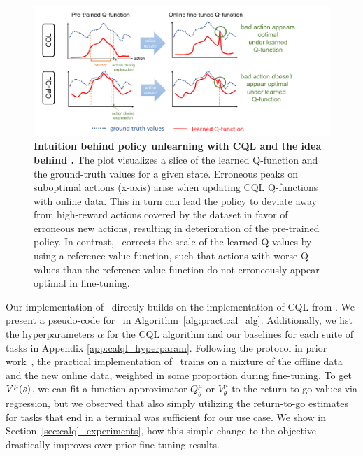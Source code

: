 \begin{figure}
\centering
\vspace{-0.2cm}
\includegraphics[trim={0 0 2.7cm 0},clip,width=0.98\linewidth]{chapters/cal_ql/figs-sample/figure_for_calql_final.pdf}
\vspace{-0.2cm}
\caption{
\footnotesize{\textbf{Intuition behind policy unlearning with CQL and the idea behind \methodname.} The plot visualizes a slice of the learned Q-function and the ground-truth values for a given state. Erroneous peaks on suboptimal actions (x-axis) arise when updating CQL Q-functions with online data. This in turn can lead the policy to deviate away from high-reward actions covered by the dataset in favor of erroneous new actions, resulting in deterioration of the pre-trained policy. In contrast, \methodname\ corrects the scale of the learned Q-values by using a reference value function, such that actions with worse Q-values than the reference value function do not erroneously appear optimal in fine-tuning.}}
\label{fig:calql_idea}
\vspace{-0.4cm}
\end{figure}

 Our implementation of \methodname\ directly builds on the implementation of CQL from \citet{geng2022jaxcql}. We present a pseudo-code for \methodname\ in Algorithm~\ref{alg:practical_alg}. Additionally, we list the hyperparameters $\alpha$ for the CQL algorithm and our baselines for each suite of tasks in Appendix \ref{app:calql_hyperparam}. Following the protocol in prior work~\citep{kostrikov2021iql,song2023hybrid}, the practical implementation of \methodname\ trains on a mixture of the offline data and the new online data, weighted in some proportion during fine-tuning. To get $V^\mu(s)$, we can fit a function approximator $Q^\mu_\theta$ or $V^\mu_\theta$ to the return-to-go values via regression, but we observed that also simply utilizing the return-to-go estimates for tasks that end in a terminal was sufficient for our use case. We show in  Section~\ref{sec:calql_experiments}, how this simple change to the objective drastically improves over prior fine-tuning results.

\vspace{-0.2cm}